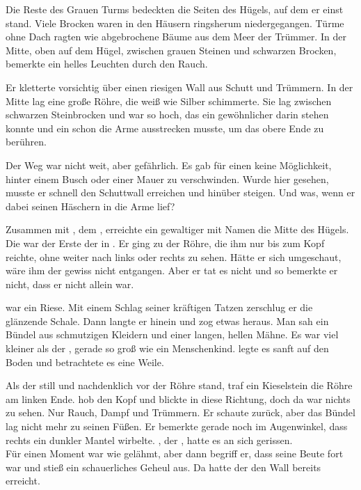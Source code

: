\begin{Large}
Die Reste des Grauen Turms bedeckten die Seiten des Hügels, auf dem er einst stand. Viele Brocken waren in den Häusern ringsherum niedergegangen. Türme ohne Dach ragten wie abgebrochene Bäume aus dem Meer der Trümmer. In der Mitte, oben auf dem Hügel, zwischen grauen Steinen und schwarzen Brocken, bemerkte {\Eno} ein helles Leuchten durch den Rauch. 

Er kletterte vorsichtig über einen riesigen Wall aus Schutt und Trümmern. In der Mitte lag eine große Röhre, die weiß wie Silber schimmerte. Sie lag zwischen schwarzen Steinbrocken und war so hoch, das ein gewöhnlicher \Bangiri darin stehen konnte und ein {\Enlaender} schon die Arme ausstrecken musste, um das obere Ende zu berühren. 

Der Weg war nicht weit, aber gefährlich. Es gab für einen {\Schattenlaufer} keine Möglichkeit, hinter einem Busch oder einer Mauer zu verschwinden. Wurde {\Eno} hier gesehen, musste er schnell den Schuttwall erreichen und hinüber steigen. Und was, wenn er dabei seinen Häschern in die Arme lief?

Zusammen mit {\Eno}, dem {\Schattenlaufer}, erreichte ein gewaltiger {\Bangiri} mit Namen {\Pato} die Mitte des Hügels. Die {\Pato} war der Erste der {\Bangiri} in {\Tern}. Er ging zu der Röhre, die ihm nur bis zum Kopf reichte, ohne weiter nach links oder rechts zu sehen. Hätte er sich umgeschaut, wäre ihm der {\Schattenlaufer} gewiss nicht entgangen. Aber er tat es nicht und so bemerkte er nicht, dass er nicht allein war.

{\Pato} war ein Riese. Mit einem Schlag seiner kräftigen Tatzen zerschlug er die glänzende Schale. Dann langte er hinein und zog etwas heraus. Man sah ein Bündel aus schmutzigen Kleidern und einer langen, hellen Mähne. Es war viel kleiner als der {\Bangiri}, gerade so groß wie ein Menschenkind. {\Pato} legte es sanft auf den Boden und betrachtete es eine Weile. 

Als der {\Bangiri} still und nachdenklich vor der Röhre stand, traf ein Kieselstein die Röhre am linken Ende. {\Pato} hob den Kopf und blickte in diese Richtung, doch da war nichts zu sehen. Nur Rauch, Dampf und Trümmern. Er schaute zurück, aber das Bündel lag nicht mehr zu seinen Füßen. Er bemerkte gerade noch im Augenwinkel, dass rechts ein dunkler Mantel wirbelte. {\Eno}, der {\Schattenjager}, hatte es an sich gerissen.\\
Für einen Moment war {\Pato} wie gelähmt, aber dann begriff er, dass seine Beute fort war und stieß ein schauerliches Geheul aus. Da hatte der {\Schattenjager} den Wall bereits erreicht.


\end{Large}
